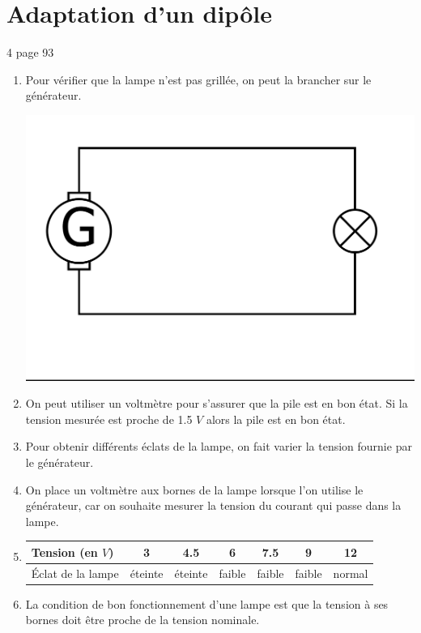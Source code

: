 \documentclass[12pt,a4paper]{article}
\begin{document}
\section{Adaptation d'un dipôle}

\begin{myact}{4 page 93}
	\begin{enumerate}
		\item Pour vérifier que la lampe n'est pas grillée, on peut la brancher sur le générateur. \\
		\begin{center}
			\includegraphics[scale=0.2]{img/gen_lamp}
		\end{center}
	
		\item On peut utiliser un voltmètre pour s'assurer que la pile est en bon état. Si la tension mesurée est proche de \num{1.5} $V$ alors la pile est en bon état.
		
		\item Pour obtenir différents éclats de la lampe, on fait varier la tension fournie par le générateur.
		
		\item On place un voltmètre aux bornes de la lampe lorsque l'on utilise le générateur, car on souhaite mesurer la tension du courant qui passe dans la lampe.
		
		\item \setlength{\tabcolsep}{4pt}
		\begin{tabular}{|l|c|c|c|c|c|c|}
			\hline
			Tension (en $V$)    & 3      & \num{4.5} & \num{6} & \num{7.5} & \num{9} & \num{12} \\ \hline
			\'Eclat de la lampe & éteinte & éteinte    & faible  & faible    & faible  & normal  \\ \hline
		\end{tabular}
	
		\item La condition de bon fonctionnement d'une lampe est que la tension à ses bornes doit être proche de la tension nominale.
	\end{enumerate}
\end{myact}
\end{document}
